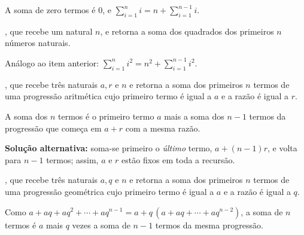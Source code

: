{{\begin{Qlist}
        \begin{solution}
        A soma de zero termos é $0$, e $\sum_{i=1}^{n} i = n + \sum_{i=1}^{n-1} i$.

        \end{solution}

        \item[(h)] , que recebe um natural $n$, e 
            retorna a soma dos quadrados dos primeiros $n$ números naturais.

        \begin{solution}
        Análogo ao item anterior: $\sum_{i=1}^{n} i^2 = n^2 + \sum_{i=1}^{n-1} i^2$.

        \end{solution}

        \item[(i)] , que recebe 
            três naturais $a, r$ e $n$ e retorna a soma dos primeiros $n$ termos
            de uma progressão aritmética cujo primeiro termo é igual a $a$ e a razão é igual a $r$.

        \begin{solution}
        A soma dos $n$ termos é o primeiro termo $a$ mais a soma dos $n-1$ termos da
        progressão que começa em $a+r$ com a mesma razão.


        \textbf{Solução alternativa:} soma-se primeiro o \emph{último} termo, $a+(n-1)r$, e volta para $n-1$ termos; assim, $a$ e $r$ estão fixos em toda a recursão.

        \end{solution}

        \item[(j)] , que recebe
            três naturais $a, q$ e $n$ e retorna a soma dos primeiros $n$ termos
            de uma progressão geométrica cujo primeiro termo é igual a $a$ e a razão é igual a $q$.

        \begin{solution}
        Como $a + aq + aq^2 + \cdots + aq^{n-1} = a + q\,(a + aq + \cdots + aq^{n-2})$, a soma de
        $n$ termos é $a$ mais $q$ vezes a soma de $n-1$ termos da mesma progressão.


\end{solution}
\end{Qlist}}}
